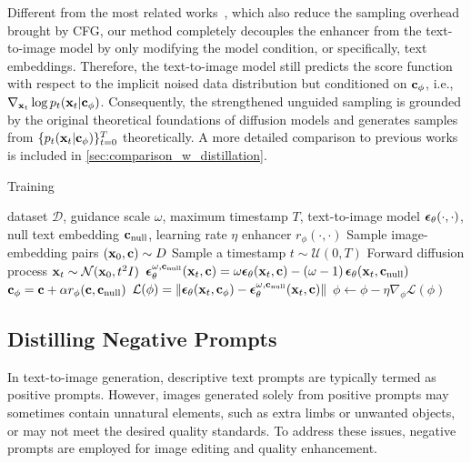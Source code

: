 Different from the most related works~\cite{meng2023distillation,hsiao2024plug}, which also reduce the sampling overhead brought by CFG, our method completely decouples the enhancer from the text-to-image model by only modifying the model condition, or specifically, text embeddings. Therefore, the text-to-image model still predicts the score function with respect to the implicit noised data distribution but conditioned on $\mathbf{c}_\phi$, i.e., $\nabla_{\mathbf{x}_t} \log p_{t}(\mathbf{x}_t|\mathbf{c}_\phi)$. 
Consequently, the strengthened unguided sampling is grounded by the original theoretical foundations of diffusion models and generates samples from $\{p_{t}(\mathbf{x}_t|\mathbf{c}_\phi)\}_{t=0}^T$ theoretically. A more detailed comparison to previous works is included in \cref{sec:comparison_w_distillation}.


\begin{algorithm}[t]
   \caption{\ourName Training}
   \label{alg:alg}
\begin{algorithmic}
    dataset $\mathcal{D}$, guidance scale $\omega$, maximum timestamp $T$, text-to-image model $\boldsymbol{\epsilon}_{\theta}(\cdot,\cdot)$, null text embedding $\mathbf{c}_\text{null}$, learning rate $\eta$
    enhancer $r_{\phi}(\cdot,\cdot)$
   \STATE Sample image-embedding pairs $(\mathbf{x}_0, \mathbf{c}) \sim D$
   \STATE Sample a timestamp $t \sim \mathcal{U}(0, T)$
   \STATE Forward diffusion process $\mathbf{x}_t \sim \mathcal{N}(\mathbf{x}_0, t^2I)$
   \STATE $\boldsymbol{\epsilon}_{\theta}^{\omega,\mathbf{c}_{\text{null}}}(\mathbf{x}_t,\mathbf{c}) = \omega \boldsymbol{\epsilon}_{\theta}(\mathbf{x}_t,\mathbf{c}) - \left(\omega - 1\right)  \boldsymbol{\epsilon}_{\theta}(\mathbf{x}_t,\mathbf{c}_{\text{null}})$
   \STATE $\mathbf{c}_\phi = \mathbf{c} + \alpha r_{\phi}(\mathbf{c},\mathbf{c}_\text{null})$
   \STATE $\mathcal{L}(\phi) = \lVert \boldsymbol{\epsilon}_{\theta}(\mathbf{x}_t,\mathbf{c}_\phi) - \boldsymbol{\epsilon}_{\theta}^{\omega,\mathbf{c}_\text{null}}(\mathbf{x}_t,\mathbf{c}) \rVert$
   \STATE $\phi \leftarrow \phi - \eta \nabla_{\phi}\mathcal{L}(\phi)$
   \ENDWHILE
\end{algorithmic}
\end{algorithm}



\subsection{Distilling Negative Prompts}
\label{sec:negative}
In text-to-image generation, descriptive text prompts are typically termed as positive prompts. However, images generated solely from positive prompts may sometimes contain unnatural elements, such as extra limbs or unwanted objects, or may not meet the desired quality standards. To address these issues, negative prompts are employed for image editing and quality enhancement. 

